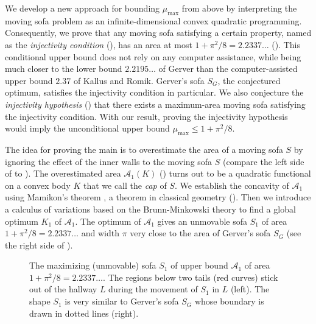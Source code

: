We develop a new approach for bounding \(\mu_{\max}\) from above by interpreting the moving sofa problem as an infinite-dimensional convex quadratic programming. Consequently, we prove that any moving sofa satisfying a certain property, named as the \emph{injectivity condition} (), has an area at most \(1 + \pi^2/8 = 2.2337\dots\) (). This conditional upper bound does not rely on any computer assistance, while being much closer to the lower bound \(2.2195\dots\) of Gerver than the computer-assisted upper bound \(2.37\) of Kallus and Romik. Gerver’s sofa \(S_G\), the conjectured optimum, satisfies the injectivity condition in particular. We also conjecture the \emph{injectivity hypothesis} () that there exists a maximum-area moving sofa satisfying the injectivity condition. With our result, proving the injectivity hypothesis would imply the unconditional upper bound \(\mu_{\max} \leq 1 + \pi^2/8\).

The idea for proving the main  is to overestimate the area of a moving sofa \(S\) by ignoring the effect of the inner walls to the moving sofa \(S\) (compare the left side of  to ). The overestimated area \(\mathcal{A}_1(K)\) () turns out to be a quadratic functional on a convex body \(K\) that we call the \emph{cap} of \(S\). We establish the concavity of \(\mathcal{A}_1\) using Mamikon’s theorem \autocite{mnatsakanianAnnularRingsEqual1997}, a theorem in classical geometry (). Then we introduce a calculus of variations based on the Brunn-Minkowski theory to find a global optimum \(K_1\) of \(\mathcal{A}_1\). The optimum of \(\mathcal{A}_1\) gives an unmovable sofa \(S_1\) of area \(1 + \pi^2/8 = 2.2337\dots\) and width \(\pi\) very close to the area of Gerver’s sofa \(S_G\) (see the right side of ).

\begin{figure}
\centering

\caption{The maximizing (unmovable) sofa \(S_1\) of upper bound \(\mathcal{A}_1\) of area \(1 + \pi^2/8 = 2.2337\dots\). The regions below two tails (red curves) stick out of the hallway \(L\) during the movement of \(S_1\) in \(L\) (left). The shape \(S_1\) is very similar to Gerver’s sofa \(S_G\) whose boundary is drawn in dotted lines (right).}
\label{fig:presofa}
\end{figure}